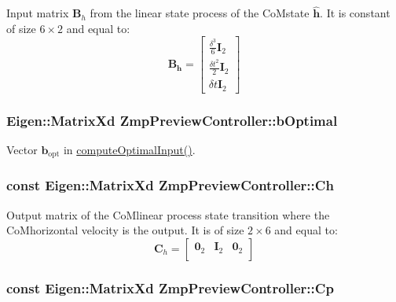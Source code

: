 \-Input matrix $\mathbf{B}_h$ from the linear state process of the \-Co\-Mstate $\hat{\mathbf{h}}$. \-It is constant of size $6\times2$ and equal to\-: \[ \mathbf{B_h} = \left[ \begin{array}{c} \frac{\delta^3}{6}\mathbf{I}_2 \\ \frac{\delta t^2}{2} \mathbf{I}_2 \\ \delta t \mathbf{I}_2 \end{array} \right] \] \hypertarget{classZmpPreviewController_a049829dccbeb5a7a1bf47f7e6679174a}{
\subsubsection[{b\-Optimal}]{\setlength{\rightskip}{0pt plus 5cm}\-Eigen\-::\-Matrix\-Xd {\bf \-Zmp\-Preview\-Controller\-::b\-Optimal}}}\label{classZmpPreviewController_a049829dccbeb5a7a1bf47f7e6679174a}
\-Vector $\mathbf{b}_{\text{opt}}$ in \hyperlink{classZmpPreviewController_aabdafde9ecc41a6d98134e0a01083d8a}{compute\-Optimal\-Input()}. \hypertarget{classZmpPreviewController_a2093754713ffb2a7adcd1310c73bf775}{
\subsubsection[{\-Ch}]{\setlength{\rightskip}{0pt plus 5cm}const \-Eigen\-::\-Matrix\-Xd {\bf \-Zmp\-Preview\-Controller\-::\-Ch}}}\label{classZmpPreviewController_a2093754713ffb2a7adcd1310c73bf775}
\-Output matrix of the \-Co\-Mlinear process state transition where the \-Co\-Mhorizontal velocity is the output. \-It is of size $2\times6$ and equal to\-: \[ \mathbf{C}_h = \left[\begin{array}{ccc} \mathbf{0}_2 & \mathbf{I}_2 & \mathbf{0}_2 \\ \end{array}\right] \] \hypertarget{classZmpPreviewController_a1a63870dcc3d51a26c4adc9c97e650ff}{
\subsubsection[{\-Cp}]{\setlength{\rightskip}{0pt plus 5cm}const \-Eigen\-::\-Matrix\-Xd {\bf \-Zmp\-Preview\-Controller\-::\-Cp}}}\label{classZmpPreviewController_a1a63870dcc3d51a26c4adc9c97e650ff}
